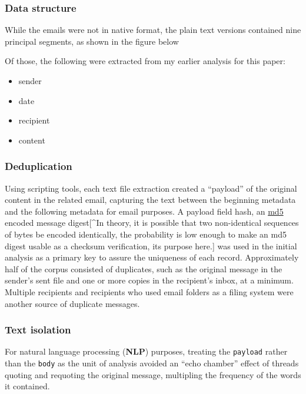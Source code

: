 \documentclass[]{article}
\providecommand{\tightlist}{%
  \setlength{\itemsep}{0pt}\setlength{\parskip}{0pt}}
\begin{document}
\hypertarget{data-structure}{%
\subsubsection{Data structure}\label{data-structure}}

While the emails were not in native format, the plain text versions
contained nine principal segments, as shown in the figure below

Of those, the following were extracted from my earlier analysis for this
paper:

\begin{itemize}
\tightlist
\item
  sender
\item
  date
\item
  recipient
\item
  content
\end{itemize}

\hypertarget{deduplication}{%
\subsubsection{Deduplication}\label{deduplication}}

Using scripting tools, each text file extraction created a ``payload''
of the original content in the related email, capturing the text between
the beginning metadata and the following metadata for email purposes. A
payload field hash, an \href{https://en.wikipedia.org/wiki/MD5}{md5}
encoded message digest{[}\^{}In theory, it is possible that two
non-identical sequences of bytes be encoded identically, the probability
is low enough to make an md5 digest usable as a checksum verification,
its purpose here.{]} was used in the initial analysis as a primary key
to assure the uniqueness of each record. Approximately half of the
corpus consisted of duplicates, such as the original message in the
sender's sent file and one or more copies in the recipient's inbox, at a
minimum. Multiple recipients and recipients who used email folders as a
filing system were another source of duplicate messages.

\hypertarget{text-isolation}{%
\subsubsection{Text isolation}\label{text-isolation}}

For natural language processing (\textbf{NLP}) purposes, treating the
\texttt{payload} rather than the \texttt{body} as the unit of analysis
avoided an ``echo chamber'' effect of threads quoting and requoting the
original message, multipling the frequency of the words it contained.
\end{document}
